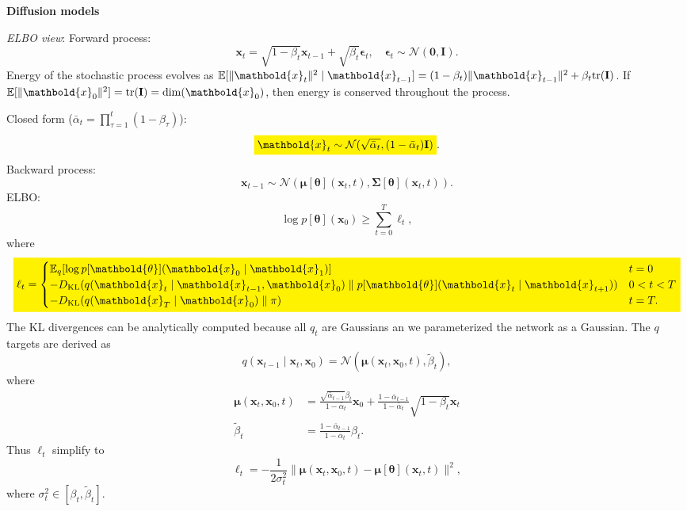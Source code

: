 \documentclass[10pt]{article}
\newenvironment{topic}[1]
{\textbf{\sffamily \footnotesize \colorbox{black}{\rlap{\textbf{\textcolor{white}{#1}}}\hspace{\linewidth}\hspace{-2\fboxsep}}}}
{}
\newenvironment{subtopic}[1]
{\begin{center}\textbf{\footnotesize \sffamily #1}\end{center}}
{}
\renewcommand{\mat}[1]{\ensuremath{\mathbf{#1}}}
\renewcommand{\vec}[1]{\ensuremath{\mathbold{#1}}}
\begin{document}
\begin{multicols*}{3}
\begin{topic}{Generative models}
\begin{subtopic}{Diffusion models}
            \textit{ELBO view}: Forward process: \[
                \vec{x}_t = \sqrt{1-\beta_t} \vec{x}_{t-1} + \sqrt{\beta_t} \vec{\epsilon}_t, \quad \vec{\epsilon}_t \sim \mathcal{N}(\vec{0}, \mat{I}).
            \]
            Energy of the stochastic process evolves as $\E[\| \vec{x}_t \|^2 \mid \vec{x}_{t-1}] =
                (1-\beta_t)\| \vec{x}_{t-1} \|^2 + \beta_t \mathrm{tr}(\mat{I})$. If $\E[\| \vec{x}_0 \|^2] =
                \mathrm{tr}(\mat{I}) = \dim(\vec{x}_0)$, then energy is conserved throughout the process.

            Closed form ($\bar{\alpha}_t = \prod_{\tau=1}^t (1-\beta_{\tau})$): \[
                \colorbox{yellow}{$\displaystyle \vec{x}_t \sim \mathcal{N}(\sqrt{\bar{\alpha}_t}, (1-\bar{\alpha}_t) \mat{I})$}.
            \]
            Backward process: \[
                \vec{x}_{t-1} \sim \mathcal{N}(\vec{\mu}[\vec{\theta}](\vec{x}_t, t), \mat{\Sigma}[\vec{\theta}](\vec{x}_t, t)).
            \]
            ELBO: \[
                \log p[\vec{\theta}](\vec{x}_0) \geq \sum_{t=0}^{T} \ell_t,
            \]
            where \[
                \colorbox{yellow}{$\displaystyle \ell_t = \begin{cases}
                    \E_q[\log p[\vec{\theta}](\vec{x}_0 \mid \vec{x}_1)]                                                          & t = 0     \\
                    -D_{\mathrm{KL}}(q(\vec{x}_t \mid \vec{x}_{t-1}, \vec{x}_0) \;\|\; p[\vec{\theta}](\vec{x}_t \mid \vec{x}_{t+1})) & 0 < t < T \\
                    -D_{\mathrm{KL}}(q(\vec{x}_T \mid \vec{x}_0) \;\|\; \pi)                                                          & t = T.
                \end{cases}$}
            \]
            The KL divergences can be analytically computed because all $q_t$ are Gaussians an we parameterized
            the network as a Gaussian. The $q$ targets are derived as \[
                q(\vec{x}_{t-1} \mid \vec{x}_t, \vec{x}_0) = \mathcal{N}(\vec{\mu}(\vec{x}_t, \vec{x}_0, t), \tilde{\beta}_t),
            \]
            where
            \begin{align*}
                \vec{\mu}(\vec{x}_t, \vec{x}_0, t) & = \frac{\sqrt{\bar{\alpha}_{t-1}} \beta_t}{1-\bar{\alpha}_t} \vec{x}_0 + \frac{1-\bar{\alpha}_{t-1}}{1-\bar{\alpha}_t} \sqrt{1-\beta_t} \vec{x}_t \\
                \tilde{\beta}_t                    & = \frac{1-\bar{\alpha}_{t-1}}{1-\bar{\alpha}_t} \beta_t.
            \end{align*}
            Thus $\ell_t$ simplify to \[
                \ell_t = -\frac{1}{2 \sigma_t^2} \| \vec{\mu}(\vec{x}_t, \vec{x}_0, t) - \vec{\mu}[\vec{\theta}](\vec{x}_t,t) \|^2,
            \]
            where $\sigma_t^2 \in [\beta_t, \tilde{\beta}_t]$.


\end{subtopic}
\end{topic}
\end{multicols*}
\end{document}
